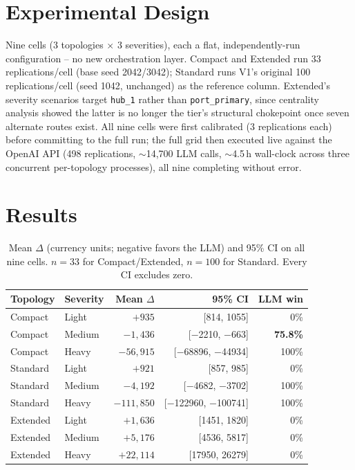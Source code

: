 \documentclass[10pt,twocolumn]{article}
\begin{document}
\section{Experimental Design}
Nine cells (3 topologies $\times$ 3 severities), each a flat, independently-run configuration -- no new orchestration layer. Compact and Extended run 33 replications/cell (base seed 2042/3042); Standard runs V1's original 100 replications/cell (seed 1042, unchanged) as the reference column. Extended's severity scenarios target \texttt{hub\_1} rather than \texttt{port\_primary}, since centrality analysis showed the latter is no longer the tier's structural chokepoint once seven alternate routes exist. All nine cells were first calibrated (3 replications each) before committing to the full run; the full grid then executed live against the OpenAI API (498 replications, $\sim$14{,}700 LLM calls, $\sim$4.5\,h wall-clock across three concurrent per-topology processes), all nine completing without error.

\section{Results}
\label{sec:results}
\begin{table}[t]
\centering
\small
\begin{tabular}{@{}llrrr@{}}
\toprule
Topology & Severity & Mean $\Delta$ & 95\% CI & LLM win \\
\midrule
Compact  & Light  & $+935$ & [814, 1055]      & 0\% \\
Compact  & Medium & $-1{,}436$ & [$-$2210, $-$663] & \textbf{75.8\%} \\
Compact  & Heavy  & $-56{,}915$ & [$-$68896, $-$44934] & 100\% \\
Standard & Light  & $+921$ & [857, 985]        & 0\% \\
Standard & Medium & $-4{,}192$ & [$-$4682, $-$3702] & 100\% \\
Standard & Heavy  & $-111{,}850$ & [$-$122960, $-$100741] & 100\% \\
Extended & Light  & $+1{,}636$ & [1451, 1820]    & 0\% \\
Extended & Medium & $+5{,}176$ & [4536, 5817]    & 0\% \\
Extended & Heavy  & $+22{,}114$ & [17950, 26279]  & 0\% \\
\bottomrule
\end{tabular}
\caption{Mean $\Delta$ (currency units; negative favors the LLM) and 95\% CI on all nine cells. $n=33$ for Compact/Extended, $n=100$ for Standard. Every CI excludes zero.}
\label{tab:grid}
\end{table}
\end{document}
